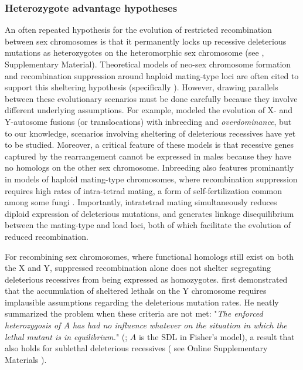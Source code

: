 \documentclass{article}
\newcommand\hl[1]{%
  \bgroup
  \hskip0pt\color{blue!80!black}%
  #1%
  \egroup
}
\begin{document}
\subsubsection*{Heterozygote advantage hypotheses}

An often repeated hypothesis for the evolution of restricted recombination between sex chromosomes is that it permanently locks up recessive deleterious mutations as heterozygotes on the heteromorphic sex chromosome (see \citealt{Ironside2010, Ponnikas2018, Branco2017}, Supplementary Material). Theoretical models of neo-sex chromosome formation and recombination suppression around haploid mating-type loci are often cited to support this sheltering hypothesis (specifically \citealt{CharlesworthWall1999, AnotonovicsAbrams2004, JohnsonAntonovicsHood2005}). However, drawing parallels between these evolutionary scenarios must be done carefully because they involve different underlying assumptions. For example, \citet{CharlesworthWall1999} modeled the evolution of X- and Y-autosome fusions (or translocations) with inbreeding and {\itshape overdominance}, but to our knowledge, scenarios involving sheltering of deleterious recessives have yet to be studied. Moreover, a critical feature of these models is that recessive genes captured by the rearrangement cannot be expressed in males because they have no homologs on the other sex chromosome. Inbreeding also features prominantly in models of haploid mating-type chromosomes, where recombination suppression requires high rates of intra-tetrad mating, a form of self-fertilization common among some fungi \citep{AnotonovicsAbrams2004, JohnsonAntonovicsHood2005}. Importantly, intratetrad mating simultaneously reduces diploid expression of deleterious mutations, and generates linkage disequilibrium between the mating-type and load loci, both of which facilitate the evolution of reduced recombination. 

For recombining sex chromosomes, where functional homologs still exist on both the X and Y, suppressed recombination alone does not shelter segregating deleterious recessives from being expressed as homozygotes. \citet{Fisher1935} first demonstrated that the accumulation of sheltered lethals on the Y chromosome requires implausible assumptions regarding the deleterious mutation rates. He neatly summarized the problem when these criteria are not met: "{\itshape The enforced heterozygosis of $A$ has had no influence whatever on the situation in which the lethal mutant is in equilibrium.}" (\citealt[][p.449]{Fisher1935}; $A$ is the SDL in Fisher's model), a result that also holds for sublethal deleterious recessives (\hl{see Online Supplementary Materials}). 
\end{document}
